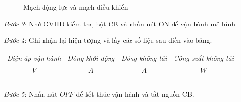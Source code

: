 \documentclass[13pt,a4paper]{extarticle}
\begin{document}
\begin{list}{--}{}
\begin{figure}[!h]
\caption{Mạch động lực và mạch điều khiển}\label{mach-dong-luc-2tu}
\end{figure}
\item \textit{Bước 3}: Nhờ GVHD kiểm tra, bật CB và nhấn nút ON để vận hành mô hình.
\item \textit{Bước 4}: Ghi nhận lại hiện tượng và lấy các số liệu sau điền vào bảng.
\begin{center}
\begin{tabular}{|c|c|c|c|}\hline
\textit{Điện áp vận hành} & \textit{Dòng khởi động} & \textit{Dòng không tải} & \textit{Công suất không tải}\\ 
$V$ & $A$ & $A$ & $W$ \\ \hline
& & & \\ \hline
& & & \\ \hline
\end{tabular}
\end{center}
\item \textit{Bước 5}: Nhấn nút $OFF$ để kết thúc vận hành và tắt nguồn CB.
\end{list}
\end{document}
